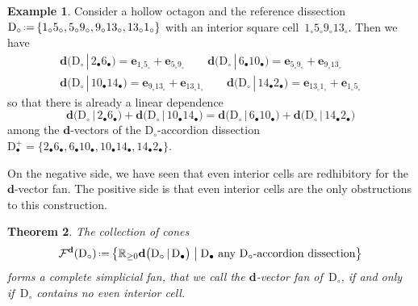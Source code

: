 \documentclass{amsart}
\newtheorem{theorem}{Theorem}%
\theoremstyle{definition}
\newtheorem{example}[theorem]{Example}
\newcommand{\R}{\mathbb{R}} %
\renewcommand{\b}[1]{\mathbf{#1}} %
\newcommand{\bigset}[2]{\big\{ #1 \;\big|\; #2 \big\}} %
\newcommand{\eqdef}{\mbox{\,\raisebox{0.2ex}{\scriptsize\ensuremath{\mathrm:}}\ensuremath{=}\,}} %
\newcommand{\darkblue}{\color{darkblue}} %
\newcommand{\defn}[1]{\textsl{\darkblue #1}} %
\newcommand{\dissection}{\mathrm{D}} %
\newcommand{\bigdvector}[2]{\mathbf{d} \big( #1  \,|\, #2 \big)} %
\newcommand{\bigdvectors}[2]{\mathbf{d} \big( #1  \,|\, #2 \big)} %
\newcommand{\dvectorFan}{\mathcal{F}^\mathbf{d}} %
\newcommand{\ma}{+} %
\begin{document}
\begin{example}
Consider a hollow octagon and the reference dissection~$\dissection_\circ \eqdef \{ 1_\circ 5_\circ, 5_\circ 9_\circ, 9_\circ 13_\circ, 13_\circ 1_\circ \}$ with an interior square cell~$1_\circ 5_\circ 9_\circ 13_\circ$. Then we have
\begin{gather*}
\bigdvector{\dissection_\circ}{2_\bullet 6_\bullet} = \b{e}_{1_\circ 5_\circ} + \b{e}_{5_\circ 9_\circ} \qquad
\bigdvector{\dissection_\circ}{6_\bullet 10_\bullet} = \b{e}_{5_\circ 9_\circ} + \b{e}_{9_\circ 13_\circ} \\
\bigdvector{\dissection_\circ}{10_\bullet 14_\bullet} = \b{e}_{9_\circ 13_\circ} + \b{e}_{13_\circ 1_\circ} \qquad
\bigdvector{\dissection_\circ}{14_\bullet 2_\bullet} = \b{e}_{13_\circ 1_\circ} + \b{e}_{1_\circ 5_\circ}
\end{gather*}
so that there is already a linear dependence
\[
 \bigdvector{\dissection_\circ}{2_\bullet 6_\bullet}
+\bigdvector{\dissection_\circ}{10_\bullet 14_\bullet}
=
 \bigdvector{\dissection_\circ}{6_\bullet 10_\bullet}
+\bigdvector{\dissection_\circ}{14_\bullet 2_\bullet}
\]
among the $\b{d}$-vectors of the $\dissection_\circ$-accordion dissection~$\dissection_\bullet^\ma = \{2_\bullet 6_\bullet, 6_\bullet 10_\bullet, 10_\bullet 14_\bullet, 14_\bullet 2_\bullet\}$.
\end{example}

On the negative side, we have seen that even interior cells are redhibitory for the $\b{d}$-vector fan. The positive side is that even interior cells are the only obstructions to this construction.

\begin{theorem}
\label{thm:dvectorFan}
The collection of cones
\[
\dvectorFan(\dissection_\circ) \eqdef \bigset{\R_{\ge0} \bigdvectors{\dissection_\circ}{\dissection_\bullet}}{\dissection_\bullet \text{ any $\dissection_\circ$-accordion dissection}}
\]
forms a complete simplicial fan, that we call the \defn{$\b{d}$-vector fan} of~$\dissection_\circ$, if and only if~$\dissection_\circ$ contains no even interior cell.
\end{theorem}
\end{document}
